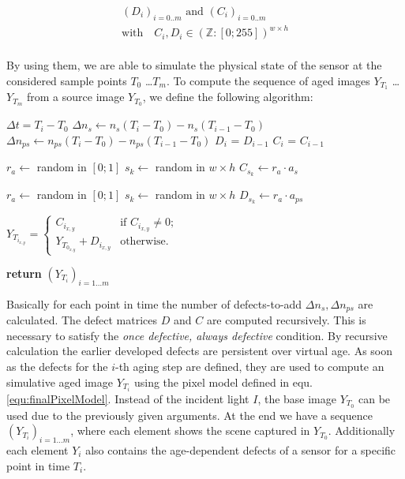 \documentclass[10pt,twocolumn,letterpaper]{article}
\begin{document}
\begin{equation}
\begin{aligned}
(D_i)_{i=0..m} \text{ and } (C_i)_{i=0..m} \\ 
\text{with} \quad C_i, D_i \in {(\mathbb{Z}:[0;255])}^{w \times h}
\end{aligned}
\end{equation}
\\
By using them, we are able to simulate the physical state of the sensor at the considered sample points $T_0$ \dots $T_m$. To compute the sequence of aged images $Y_{T_1}$ \dots $Y_{T_m}$ from a source image $Y_{T_0}$, we define the following algorithm:
\\

\begin{algorithmic}[1]


\State $\Delta t = T_i - T_0 $
\State $\Delta n_s\gets n_s(T_i - T_0) - n_s(T_{i-1} - T_0) $ 
\State $\Delta n_{ps}\gets n_{ps}(T_i - T_0) - n_{ps}(T_{i-1} - T_0) $
\State $D_i$ = $D_{i-1}$
\State $C_i$ = $C_{i-1}$

    \State $r_a \gets$ random in $[0;1]$
    \State $s_k \gets$ random in $w \times h$
    \State $C_{s_k} \gets r_a \cdot a_s$
  \EndFor
  
    \State $r_a \gets$ random in $[0;1]$
    \State $s_k \gets$ random in $w \times h$
    \State $D_{s_k} \gets r_a \cdot a_{ps}$
  \EndFor
  
  
  $Y_{T_{i_{x,y}}} = \begin{cases}
  C_{i_{x,y}}  & \text{if $C_{i_{x,y}} \neq 0$}; \\
  Y_{T_{0_{x,y}}} +D_{i_{x,y}}  & \text{otherwise}.
  \end{cases}$
  
\EndFor
\State \textbf{return} $(Y_{T_i})_{i=1 \dots m}$
\EndProcedure
\end{algorithmic}


Basically for each point in time the number of defects-to-add $\Delta n_s, \Delta n_{ps}$ are calculated. The defect matrices $D$ and $C$ are computed recursively. This is necessary to satisfy the \emph{once defective, always defective} condition. By recursive calculation the earlier developed defects are persistent over virtual age. As soon as the defects for the $i$-th aging step are defined, they are used to compute an simulative aged image $Y_{T_i}$ using the pixel model defined in equ. \ref{equ:finalPixelModel}. Instead of the incident light $I$, the base image $Y_{T_0}$ can be used due to the previously given arguments. At the end we have a sequence  $(Y_{T_i})_{i=1 \dots m}$, where each element shows the scene captured in $Y_{T_0}$. Additionally each element $Y_i$ also contains the age-dependent defects of a sensor for a specific point in time $T_i$.
\end{document}
